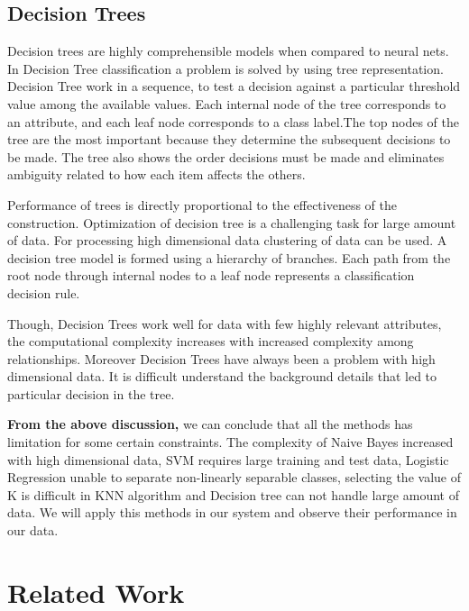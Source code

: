 \documentclass[12pt,a4paper]{report}
\begin{document}
 \subsection{Decision Trees}
 Decision trees are highly comprehensible models when compared to neural nets.
 In Decision Tree classification a problem is solved by using tree representation. Decision Tree work in a sequence, to test a decision against a particular threshold value among the available values. Each internal node of the tree corresponds to an attribute, and each leaf node corresponds to a class label.The top nodes of the tree are the most important because they determine the subsequent decisions to be made. The tree also shows the order decisions must be made and eliminates ambiguity related to how each item affects the others.
\par
\vspace{0.5cm}
Performance of trees is directly proportional to the effectiveness of the construction. Optimization of decision tree is a challenging task for large amount of data. For processing high dimensional data clustering of data can be used.
A decision tree model is formed using a hierarchy of branches. Each path from the root node through internal nodes to a leaf node represents a classification decision rule.
\par
\vspace{0.5cm}
Though, Decision Trees work well for data with few highly relevant attributes, the computational complexity increases with increased complexity among relationships. Moreover Decision Trees have always been a problem with high dimensional data. It is difficult understand the background details that led to particular decision in the tree. 

\par
\vspace{0.7cm}
\noindent
\textbf{From the above discussion,} we can conclude that all the methods has limitation for some certain constraints. The complexity of Naive Bayes increased with high dimensional data, SVM requires large training and test data, Logistic Regression unable to separate non-linearly separable classes, selecting the value of K is difficult in KNN algorithm and Decision tree can not handle large amount of data. We will apply this methods in our system and observe their performance in our data.

\section{Related Work}
\end{document}
